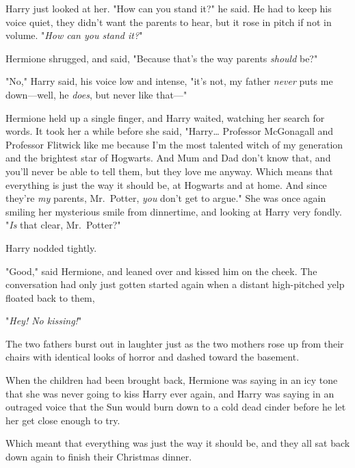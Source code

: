 Harry just looked at her. "How can you stand it?" he said. He had to keep his 
voice quiet, they didn't want the parents to hear, but it rose in pitch if not 
in volume. "\emph{How can you stand it?}"

Hermione shrugged, and said, "Because that's the way parents \emph{should} be?"

"No," Harry said, his voice low and intense, "it's not, my father \emph{never} 
puts me down---well, he \emph{does}, but never like that---"

Hermione held up a single finger, and Harry waited, watching her search for 
words. It took her a while before she said, "Harry{\ldots} Professor McGonagall 
and Professor Flitwick like me because I'm the most talented witch of my 
generation and the brightest star of Hogwarts. And Mum and Dad don't know that, 
and you'll never be able to tell them, but they love me anyway. Which means 
that everything is just the way it should be, at Hogwarts and at home. And 
since they're \emph{my} parents, Mr.~Potter, \emph{you} don't get to argue." 
She was once again smiling her mysterious smile from dinnertime, and looking at 
Harry very fondly. "\emph{Is} that clear, Mr.~Potter?"

Harry nodded tightly.

"Good," said Hermione, and leaned over and kissed him on the cheek.
\sbreak
The conversation had only just gotten started again when a distant high-pitched 
yelp floated back to them,

"\emph{Hey! No kissing!}"

The two fathers burst out in laughter just as the two mothers rose up from 
their chairs with identical looks of horror and dashed toward the basement.

When the children had been brought back, Hermione was saying in an icy tone 
that she was never going to kiss Harry ever again, and Harry was saying in an 
outraged voice that the Sun would burn down to a cold dead cinder before he let 
her get close enough to try.

Which meant that everything was just the way it should be, and they all sat 
back down again to finish their Christmas dinner.
